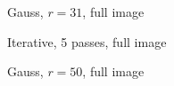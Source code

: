 \documentclass[english,fleqn,10pt,twocolumn]{article}
\begin{document}
\begin{figure}[H]
    \centering {}
    \caption{Gauss, $r = 31$, full image}
\end{figure}

\begin{figure}[H]
    \centering {}
    \caption{Iterative, 5 passes, full image}
\end{figure}

\begin{figure}[H]
    \centering {}
    \caption{Gauss, $r = 50$, full image}
\end{figure}
\end{document}

